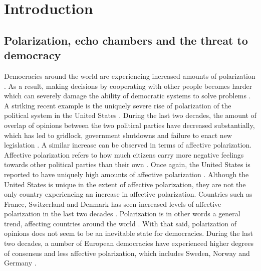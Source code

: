 \documentclass{article}
\begin{document}
\newpage
\tableofcontents
\newpage

\section{Introduction}

\subsection{Polarization, echo chambers and the threat to democracy}

Democracies around the world are experiencing increased amounts of polarization \cite{boxell_cross-country_2020,mccoy_polarization_2018, somer_deja_2018}. 
As a result, making decisions by cooperating with other people becomes harder which can severely damage the ability of democratic systems to solve problems \cite{andris_rise_2015,levin_dynamics_2021,mccoy_polarization_2018}. 
A striking recent example is the uniquely severe rise of polarization of the political system in the United States \cite{dimock_america_2020}. 
During the last two decades, the amount of overlap of opinions between the two political parties have decreased substantially, which has led to gridlock, government shutdowns and failure to enact new legislation \cite{andris_rise_2015, pew_research_center_political_2014-1}. 
A similar increase can be observed in terms of affective polarization. Affective polarization refers to how much citizens carry more negative feelings towards other political parties than their own \cite{boxell_cross-country_2020, iyengar_origins_2019}. 
Once again, the United States is reported to have uniquely high amounts of affective polarization \cite{boxell_cross-country_2020}. 
Although the United States is unique in the extent of affective polarization, they are not the only country experiencing an increase in affective polarization. 
Countries such as France, Switzerland and Denmark has seen increased levels of affective polarization in the last two decades \cite{boxell_cross-country_2020}. 
Polarization is in other words a general trend, affecting countries around the world \cite{mccoy_polarization_2018, somer_deja_2018, wilson_polarization_2020}. 
With that said, polarization of opinions does not seem to be an inevitable state for democracies. 
During the last two decades, a number of European democracies have experienced higher degrees of consensus and less affective polarization, which includes Sweden, Norway and Germany \cite{boxell_cross-country_2020}. 
\end{document}
